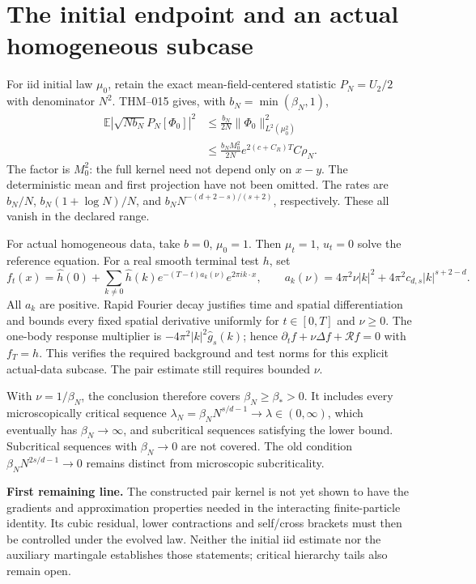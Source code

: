 \documentclass[10pt]{article}
\newcommand{\E}{\mathbb E}
\newcommand{\R}{\mathcal R}
\newcommand{\norm}[1]{\lVert #1\rVert}
\begin{document}
\section*{The initial endpoint and an actual homogeneous subcase}
For iid initial law $\mu_0$, retain the exact mean-field-centered statistic
$P_N=U_2/2$ with denominator $N^2$. THM--015 gives, with
$b_N=\min(\beta_N,1)$,
\begin{align*}
 \E\left|\sqrt{Nb_N}P_N[\Phi_0]\right|^2
 &\le\frac{b_N}{2N}\norm{\Phi_0}_{L^2(\mu_0^2)}^2\\
 &\le\frac{b_NM_0^2}{2N}e^{2(c+C_R)T}C\rho_N.
\end{align*}
The factor is $M_0^2$: the full kernel need not depend only on $x-y$.
The deterministic mean and first projection have not been omitted. The rates
are $b_N/N$, $b_N(1+\log N)/N$, and
$b_NN^{-(d+2-s)/(s+2)}$, respectively. These all vanish in the declared range.

For actual homogeneous data, take $b=0$, $\mu_0=1$. Then $\mu_t=1$, $u_t=0$
solve the reference equation. For a real smooth terminal test $h$, set
\[
 f_t(x)=\widehat h(0)+\sum_{k\ne0}\widehat h(k)
 e^{-(T-t)a_k(\nu)}e^{2\pi i k\cdot x},\qquad
 a_k(\nu)=4\pi^2\nu|k|^2+4\pi^2c_{d,s}|k|^{s+2-d}.
\]
All $a_k$ are positive. Rapid Fourier decay justifies time and spatial
differentiation and bounds every fixed spatial derivative uniformly for
$t\in[0,T]$ and $\nu\ge0$. The one-body response multiplier is
$-4\pi^2|k|^2\widehat g_s(k)$; hence
$\partial_tf+\nu\Delta f+\R f=0$ with $f_T=h$.
This verifies the required background and test norms for this explicit
actual-data subcase. The pair estimate still requires bounded $\nu$.

With $\nu=1/\beta_N$, the conclusion therefore covers
$\beta_N\ge\beta_*>0$. It includes every microscopically critical sequence
$\lambda_N=\beta_NN^{s/d-1}\to\lambda\in(0,\infty)$, which eventually has
$\beta_N\to\infty$, and subcritical sequences satisfying the lower bound.
Subcritical sequences with $\beta_N\to0$ are not covered. The old condition
$\beta_NN^{2s/d-1}\to0$ remains distinct from microscopic subcriticality.

\noindent\textbf{First remaining line.} The constructed pair kernel is not yet
shown to have the gradients and approximation properties needed in the
interacting finite-particle identity. Its cubic residual, lower contractions
and self/cross brackets must then be controlled under the evolved law.
Neither the initial iid estimate nor the auxiliary martingale establishes
those statements; critical hierarchy tails also remain open.
\end{document}
